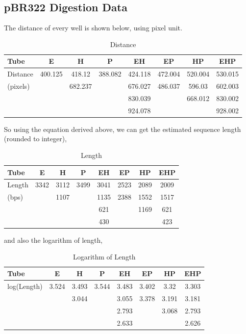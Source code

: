 \documentclass{article}
\begin{document}
        \subsection{pBR322 Digestion Data}
            The distance of every well is shown below, using pixel unit.
            \begin{table}[H]
                \caption{Distance}
                \centering
                \begin{tabular}{|l|c|c|c|c|c|c|c|}
                    \hline
                    Tube&E&H&P&EH&EP&HP&EHP\\
                    \hline
                    Distance&400.125&418.12&388.082&424.118&472.004&520.004&530.015\\
                    (pixels)&&682.237&&676.027&486.037&596.03&602.003\\
                    &&&&830.039&&668.012&830.002\\
                    &&&&924.078&&&928.002\\
                    \hline
                \end{tabular}
                \label{data.table}
            \end{table}
            So using the equation derived above, we can get the estimated sequence length (rounded to integer),
            \begin{table}[H]
                \caption{Length}
                \centering
                \begin{tabular}{|l|c|c|c|c|c|c|c|}
                    \hline
                    Tube&E&H&P&EH&EP&HP&EHP\\
                    \hline
                    Length&3342&3112&3499&3041&2523&2089&2009\\
                    (bps)&&1107&&1135&2388&1552&1517\\
                    &&&&621&&1169&621\\
                    &&&&430&&&423\\
                    \hline
                \end{tabular}
                \label{data.len.table}
            \end{table}
            and also the logarithm of length,
            \begin{table}[H]
                \caption{Logarithm of Length}
                \centering
                \begin{tabular}{|l|c|c|c|c|c|c|c|}
                    \hline
                    Tube&E&H&P&EH&EP&HP&EHP\\
                    \hline
                    log(Length)&3.524&3.493&3.544&3.483&3.402&3.32&3.303\\
                    &&3.044&&3.055&3.378&3.191&3.181\\
                    &&&&2.793&&3.068&2.793\\
                    &&&&2.633&&&2.626\\
                    \hline
                \end{tabular}
                \label{data.log.table}
            \end{table}
\end{document}
